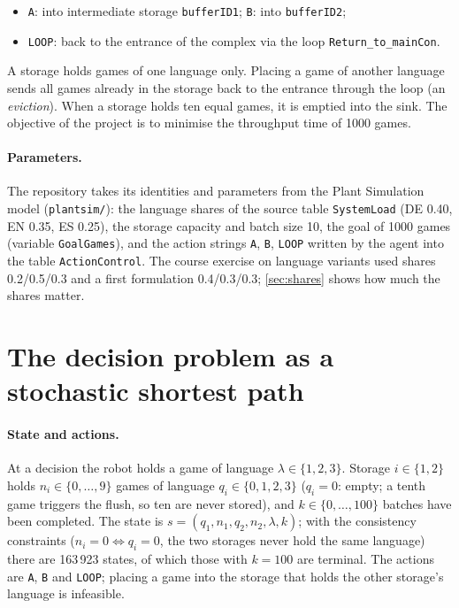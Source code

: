 \documentclass[11pt,a4paper]{article}
\begin{document}
\begin{itemize}
  \item \texttt{A}: into intermediate storage \texttt{bufferID1}; \texttt{B}: into \texttt{bufferID2};
  \item \texttt{LOOP}: back to the entrance of the complex via the loop \texttt{Return\_to\_mainCon}.
\end{itemize}
A storage holds games of one language only. Placing a game of another language sends all games already in the
storage back to the entrance through the loop (an \emph{eviction}). When a storage holds ten equal games, it is
emptied into the sink. The objective of the project is to minimise the throughput time of 1000 games.

\paragraph{Parameters.} The repository takes its identities and parameters from the Plant Simulation model
(\texttt{plantsim/}): the language shares of the source table \texttt{SystemLoad} (DE 0.40, EN 0.35, ES 0.25), the
storage capacity and batch size 10, the goal of 1000 games (variable \texttt{GoalGames}), and the action strings
\texttt{A}, \texttt{B}, \texttt{LOOP} written by the agent into the table \texttt{ActionControl}. The course
exercise on language variants used shares 0.2/0.5/0.3 and a first formulation 0.4/0.3/0.3; \cref{sec:shares}
shows how much the shares matter.

\section{The decision problem as a stochastic shortest path}

\paragraph{State and actions.} At a decision the robot holds a game of language $\lambda \in \{1,2,3\}$. Storage
$i \in \{1,2\}$ holds $n_i \in \{0,\dots,9\}$ games of language $q_i \in \{0,1,2,3\}$ ($q_i = 0$: empty; a tenth game
triggers the flush, so ten are never stored), and $k \in \{0,\dots,100\}$ batches have been completed. The state is
$s = (q_1, n_1, q_2, n_2, \lambda, k)$; with the consistency constraints ($n_i = 0 \Leftrightarrow q_i = 0$, the two
storages never hold the same language) there are 163\,923 states, of which those with $k = 100$ are terminal. The
actions are \texttt{A}, \texttt{B} and \texttt{LOOP}; placing a game into the storage that holds the other storage's
language is infeasible.
\end{document}
